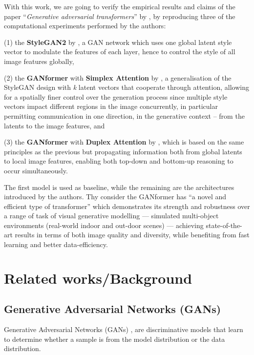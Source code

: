 \documentclass{article}
\begin{document}
	With this work, we are going to verify the empirical results and claims of the paper 
	``\emph{Generative adversarial transformers}'' by \citet{hudson2021generative}, by reproducing 
	three of the computational experiments performed by the authors:
	\begin{enumerate*}
		\item[(1)] the \textbf{StyleGAN2} by \citet{karras2020analyzing} \cite{karras2019style}, a GAN 
		network which uses one 
		global latent style vector to modulate the features of each layer, hence to control the style of all 
		image features globally,
		\item[(2)] the \textbf{GANformer} with \textbf{Simplex Attention} by 
		\citet{hudson2021generative}, a generalisation of the StyleGAN design with \textit{k} latent 
		vectors that cooperate through attention, allowing for a spatially finer control over the generation 
		process since multiple style vectors impact different regions in the image concurrently, in 
		particular permitting communication in one direction, in the generative context – from the latents 
		to the image features, and
		\item[(3)] the \textbf{GANformer} with \textbf{Duplex Attention} by \citet{hudson2021generative}, 
		which is based on the same principles as the previous but propagating information both from 
		global latents to local image features, enabling both top-down and bottom-up reasoning to occur 
		simultaneously.
	\end{enumerate*} 
	
	The first model is used as baseline, while the remaining are the architectures introduced by the 
	authors. Thy consider the GANformer has ``a novel and efficient type of transformer'' which 
	demonstrates its strength and robustness over a range of task of visual generative modelling —  
	simulated multi-object environments (real-world indoor and out-door scenes) — achieving 
	state-of-the-art results in terms of both image quality and diversity, while benefiting from fast 
	learning and better data-efficiency. 
	

	\section{Related works/Background}	
	
	\subsection{Generative Adversarial Networks (GANs)}\label{sec:gan}
	Generative Adversarial Networks (GANs) \cite{goodfellow2014generative}, are discriminative models 
	that learn to determine whether a sample is from the model distribution or the data distribution. 
	
\end{document}
